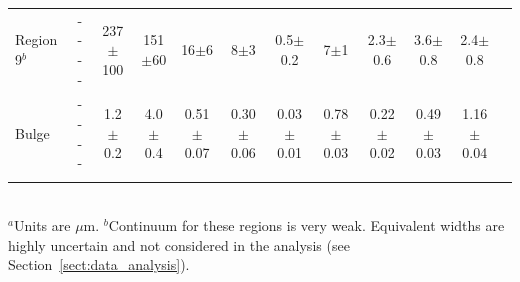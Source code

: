 \begin{table}
\begin{minipage}{200mm}
\begin{tabular}{l c c  c  c  c  c  c  c  c  c c }
 Region 9$^b$ & - - - -                 & 237$\pm$100          & 151$\pm$60        & 16$\pm$6                 & 8$\pm$3                   & 0.5$\pm$0.2             & 7$\pm$1                   & 2.3$\pm$0.6             & 3.6$\pm$0.8                 & 2.4$\pm$0.8  \\
 Bulge       & - - - -                          & 1.2$\pm$0.2            & 4.0$\pm$0.4        & 0.51$\pm$0.07         & 0.30$\pm$0.06        & 0.03$\pm$0.01        & 0.78$\pm$0.03        & 0.22$\pm$0.02        & 0.49$\pm$0.03            & 1.16$\pm$0.04 \\       
\hline
 \label{EQW}
\end{tabular}\\
{$^a$Units are $\mu$m. 
$^b$Continuum for these regions is very weak.  Equivalent widths are highly uncertain and not considered in the analysis (see Section~\ref{sect:data_analysis}).}
\end{minipage}
\end{table}


